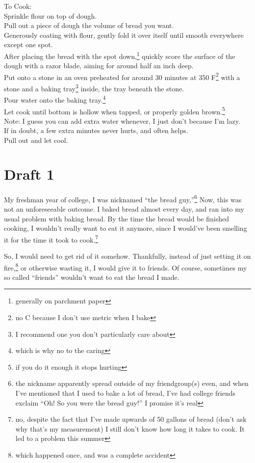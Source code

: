 \documentclass[12pt]{article}[titlepage]
\newcommand{\say}[1]{``#1''}
\newcommand{\1}{\={a}}
\newcommand{\2}{\={e}}
\newcommand{\3}{\={\i}}
\newcommand{\4}{\=o}
\newcommand{\5}{\=u}
\newcommand{\6}{\={A}}
\renewcommand{\,}{\textsuperscript{,}}
\begin{document}
To Cook:\\
Sprinkle flour on top of dough.\\
Pull out a piece of dough the volume of bread you want.\\
Generously coating with flour, gently fold it over itself until smooth everywhere except one spot.\\
After placing the bread with the spot down,\footnote{generally on parchment paper} quickly score the surface of the dough with a razor blade, aiming for around half an inch deep.\\
Put onto a stone in an oven preheated for around 30 minutes at 350 F\footnote{no C because I don't use metric when I bake} with a stone and a baking tray\footnote{I recommend one you don't particularly care about} inside, the tray beneath the stone.\\
Pour water onto the baking tray.\footnote{which is why no to the caring}\\
Let cook until bottom is hollow when tapped, or properly golden brown.\footnote{if you do it enough it stops hurting}\\
Note: I guess you can add extra water whenever, I just don't because I'm lazy.\\
If in doubt, a few extra minutes never hurts, and often helps.\\
Pull out and let cool.\\

\section{Draft 1}
My freshman year of college, I was nicknamed \say{the bread guy,}\footnote{the nickname apparently spread outside of my friendgroup(s) even, and when I've mentioned that I used to bake a lot of bread, I've had college friends exclaim \say{Oh! So you were the bread guy!} I promise it's real}
Now, this was not an unforeseeable outcome.
I baked bread almost every day, and ran into my usual problem with baking bread.
By the time the bread would be finished cooking, I wouldn't really want to eat it anymore, since I would've been smelling it for the time it took to cook.\footnote{no, despite the fact that I've made upwards of 50 gallons of bread (don't ask why that's my measurement) I still don't know how long it takes to cook. It led to a problem this summer}

So, I would need to get rid of it somehow.
Thankfully, instead of just setting it on fire,\footnote{which happened once, and was a complete accident} or otherwise wasting it, I would give it to friends.
Of course, sometimes my so called \say{friends} wouldn't want to eat the bread I made.
\end{document}
